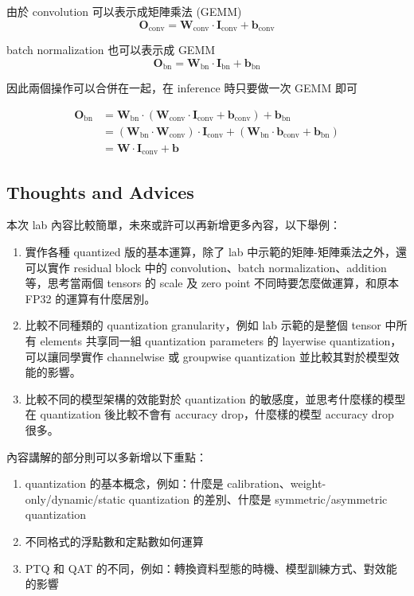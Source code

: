 \documentclass[12pt]{article}
\begin{document}

由於 convolution 可以表示成矩陣乘法 (GEMM)
$$
\mathbf{O}_\text{conv} = \mathbf{W}_\text{conv} \cdot \mathbf{I}_\text{conv} + \mathbf{b}_\text{conv}
$$

batch normalization 也可以表示成 GEMM
$$
\mathbf{O}_\text{bn} = \mathbf{W}_\text{bn} \cdot \mathbf{I}_\text{bn} + \mathbf{b}_\text{bn}
$$

因此兩個操作可以合併在一起，在 inference 時只要做一次 GEMM 即可

\begin{align*}
\mathbf{O}_\text{bn} &= \mathbf{W}_\text{bn} \cdot (\mathbf{W}_\text{conv} \cdot \mathbf{I}_\text{conv} + \mathbf{b}_\text{conv}) + \mathbf{b}_\text{bn} \\
&= (\mathbf{W}_\text{bn} \cdot \mathbf{W}_\text{conv}) \cdot \mathbf{I}_\text{conv} + (\mathbf{W}_\text{bn} \cdot \mathbf{b}_\text{conv} + \mathbf{b}_\text{bn}) \\
&= \mathbf{W} \cdot \mathbf{I}_\text{conv} + \mathbf{b}
\end{align*}

\subsection{Thoughts and Advices}

本次 lab 內容比較簡單，未來或許可以再新增更多內容，以下舉例：

\begin{enumerate}
    \item 實作各種 quantized 版的基本運算，除了 lab 中示範的矩陣-矩陣乘法之外，還可以實作 residual block 中的 convolution、batch normalization、addition 等，思考當兩個 tensors 的 scale 及 zero point 不同時要怎麼做運算，和原本 FP32 的運算有什麼居別。
    \item 比較不同種類的 quantization granularity，例如 lab 示範的是整個 tensor 中所有 elements 共享同一組 quantization parameters 的 layerwise quantization，可以讓同學實作 channelwise 或 groupwise quantization 並比較其對於模型效能的影響。
    \item 比較不同的模型架構的效能對於 quantization 的敏感度，並思考什麼樣的模型在 quantization 後比較不會有 accuracy drop，什麼樣的模型 accuracy drop 很多。
\end{enumerate}

內容講解的部分則可以多新增以下重點：

\begin{enumerate}
    \item quantization 的基本概念，例如：什麼是 calibration、weight-only/dynamic/static quantization 的差別、什麼是 symmetric/asymmetric quantization
    \item 不同格式的浮點數和定點數如何運算
    \item PTQ 和 QAT 的不同，例如：轉換資料型態的時機、模型訓練方式、對效能的影響
\end{enumerate}
\end{document}

